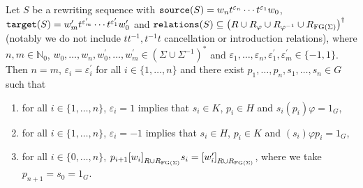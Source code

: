 \begin{lemma}\label{lem:HNN_commutator_sequence_characterization}
  Let $S$ be a rewriting sequence with
  $\texttt{source}(S) = w_n t^{\varepsilon_n} \cdots t^{\varepsilon_1} w_0$,
  $\texttt{target}(S) = w_m^\prime t^{\varepsilon^\prime_m} \cdots t^{\varepsilon^\prime_1} w^\prime_0$
  and $\texttt{relations}(S) \subseteq {\left(R \cup R_\varphi \cup R_{\varphi^{-1}}\cup R_{\textrm{FG}(\Sigma)}\right)}^\dagger$
  (notably we do not include $tt^{-1}, t^{-1}t$ cancellation or introduction relations), where
  $n,m\in\mathbb{N}_0$,
  $w_0,\ldots, w_n, w_0^\prime, \ldots, w_m^\prime \in {(\Sigma \cup \Sigma^{-1})}^\ast$ and
  $\varepsilon_1, \ldots, \varepsilon_n, \varepsilon_1^\prime, \varepsilon_m^\prime \in \{-1, 1\}$.
  Then $n = m$, $\varepsilon_i = \varepsilon_{i}^\prime$ for all $i\in\{1, \ldots, n\}$ and there
  exist $p_1, \ldots, p_n, s_1, \ldots, s_n \in G$ such that
  \begin{enumerate}
    \item for all $i\in\{1, \ldots, n\}$, $\varepsilon_i = 1$ implies that $s_i\in K$, $p_i \in
      H$ and $s_i(p_i)\varphi = 1_G$,
    \item for all $i\in \{1, \ldots, n\}$, $\varepsilon_i = -1$ implies that $s_i\in H$, $p_i \in
      K$ and $(s_i)\varphi p_i = 1_G$,
    \item for all $i\in\{0, \ldots, n\}$,
      $p_{i+1} {[w_i]}_{R\cup R_{\textrm{FG}(\Sigma)}} s_i = {[w_i^\prime]}_{R\cup R_{\textrm{FG}(\Sigma)}}$,
      where we take $p_{n+1} = s_0 = 1_G$.
  \end{enumerate}
\end{lemma}
